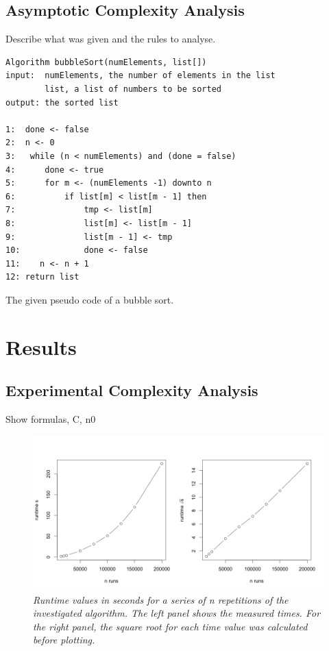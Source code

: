 \documentclass[a4paper,11pt,twoside]{article}
\begin{document}
\subsection{Asymptotic Complexity Analysis}
Describe what was given and the rules to analyse.
\begin{listing}\label{ls:bubble}
\begin{verbatim}
Algorithm bubbleSort(numElements, list[])
input:  numElements, the number of elements in the list
        list, a list of numbers to be sorted
output: the sorted list

1:  done <- false
2:  n <- 0
3:   while (n < numElements) and (done = false)
4:      done <- true
5:      for m <- (numElements -1) downto n
6:          if list[m] < list[m - 1] then
7:              tmp <- list[m]
8:              list[m] <- list[m - 1]
9:              list[m - 1] <- tmp
10:             done <- false
11:    n <- n + 1
12: return list 
\end{verbatim}
\caption{The given pseudo code of a bubble sort.}
\end{listing}

\section{Results}
\subsection{Experimental Complexity Analysis}
Show formulas, C, n0
\begin{figure} 
\includegraphics[width=\textwidth]{graph1.png}
\caption{\textit{Runtime values in seconds for a series of \textit{n}
  repetitions of the investigated algorithm. The left panel shows the
  measured times. For the right panel, the square root for each time
  value was calculated before plotting.}}
\label{fig:graph}
\end{figure}
\end{document}
